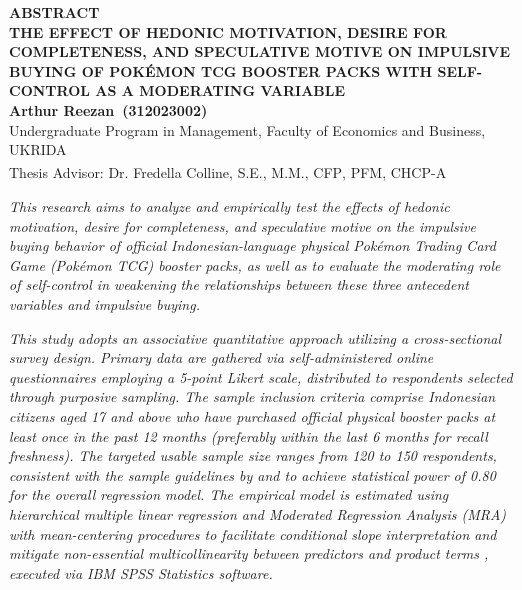 \documentclass[12pt,a4paper]{article}
\numberwithin{equation}{section}
\numberwithin{table}{section}
\numberwithin{figure}{section}
\newcommand{\namamahasiswa}{Arthur Reezan}
\newcommand{\nim}{312023002}
\newcommand{\dosbim}{Dr. Fredella Colline, S.E., M.M., CFP\textsuperscript{\textregistered}, PFM, CHCP-A}
\begin{document}
\newpage
\thispagestyle{frontmatter}
\begin{singlespace}
\begin{center}
  {\large\bfseries ABSTRACT}\\[0.2cm]
  {\bfseries THE EFFECT OF HEDONIC MOTIVATION, DESIRE FOR COMPLETENESS, AND SPECULATIVE MOTIVE ON IMPULSIVE BUYING OF POK\'EMON TCG BOOSTER PACKS WITH SELF-CONTROL AS A MODERATING VARIABLE}\\[0.2cm]
  {\bfseries\namamahasiswa\ (\nim)}\\[0.05cm]
  {\footnotesize Undergraduate Program in Management, Faculty of Economics and Business, UKRIDA}\\[0.05cm]
  {\footnotesize Thesis Advisor: \dosbim}
\end{center}

\vspace{0.15cm}
\emph{This research aims to analyze and empirically test the effects of hedonic motivation, desire for completeness, and speculative motive on the impulsive buying behavior of official Indonesian-language physical Pok\'emon Trading Card Game (Pok\'emon TCG) booster packs, as well as to evaluate the moderating role of self-control in weakening the relationships between these three antecedent variables and impulsive buying.}

\emph{This study adopts an associative quantitative approach utilizing a cross-sectional survey design. Primary data are gathered via self-administered online questionnaires employing a 5-point Likert scale, distributed to respondents selected through purposive sampling. The sample inclusion criteria comprise Indonesian citizens aged 17 and above who have purchased official physical booster packs at least once in the past 12 months (preferably within the last 6 months for recall freshness). The targeted usable sample size ranges from 120 to 150 respondents, consistent with the sample guidelines by \citet{green1991subjects} and \citet{cohen1988statistical} to achieve statistical power of 0.80 for the overall regression model. The empirical model is estimated using hierarchical multiple linear regression and Moderated Regression Analysis (MRA) with mean-centering procedures to facilitate conditional slope interpretation and mitigate non-essential multicollinearity between predictors and product terms \citep{aiken1991multiple, hayes2018introduction}, executed via IBM SPSS Statistics software.}


\end{singlespace}
\end{document}
